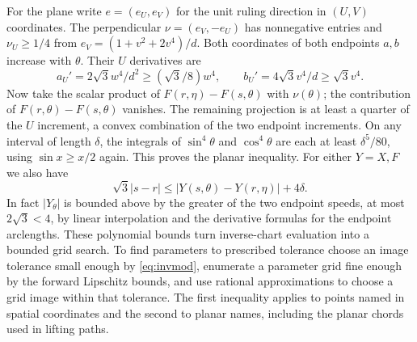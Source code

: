 For the plane write $e=(e_U,e_V)$ for the unit ruling direction in
$(U,V)$ coordinates. The perpendicular $\nu=(e_V,-e_U)$ has
nonnegative entries and $\nu_U\ge1/4$ from
$e_V=(1+v^2+2v^4)/d$. Both coordinates of both endpoints $a,b$
increase with $\theta$. Their $U$ derivatives are
\[
    a_U'=2\sqrt3 w^4/d^2\ge(\sqrt3/8)w^4,\qquad
    b_U'=4\sqrt3 v^4/d\ge\sqrt3 v^4 .
\]
Now take the scalar product of
$F(r,\eta)-F(s,\theta)$ with $\nu(\theta)$; the contribution of
$F(r,\theta)-F(s,\theta)$ vanishes. The remaining projection is at least
a quarter of the $U$ increment, a convex combination of the two endpoint
increments. On any interval of length $\delta$, the integrals of
$\sin^4\theta$ and $\cos^4\theta$ are each at least $\delta^5/80$,
using $\sin x\ge x/2$ again. This proves the planar inequality.
For either $Y=X,F$ we also have
\[
 \sqrt3|s-r|\le |Y(s,\theta)-Y(r,\eta)|+
                       4\delta .
\]
In fact $|Y_\theta|$ is bounded above by the greater of the two endpoint
speeds, at most $2\sqrt3<4$, by linear interpolation and the derivative
formulas for the endpoint arclengths. These polynomial bounds turn
inverse-chart evaluation into a bounded grid search. To find parameters
to prescribed tolerance choose an image tolerance small enough by
\eqref{eq:invmod}, enumerate a parameter grid fine enough by the forward
Lipschitz bounds, and use rational approximations to choose a grid image
within that tolerance. The first inequality applies to points named in
spatial coordinates and the second to planar names, including the
planar chords used in lifting paths.
